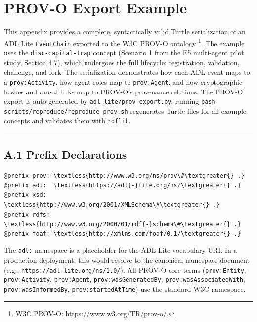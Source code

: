 \section{PROV-O Export Example}\label{a.-prov-o-export-example}

This appendix provides a complete, syntactically valid Turtle serialization of an ADL Lite \texttt{EventChain} exported to the W3C PROV-O ontology \footnote{W3C PROV-O: \url{https://www.w3.org/TR/prov-o/}.}. The example uses the \texttt{disc-capital-trap} concept (Scenario 1 from the E5 multi-agent pilot study, Section 4.7), which undergoes the full lifecycle: registration, validation, challenge, and fork. The serialization demonstrates how each ADL event maps to a \texttt{prov:Activity}, how agent roles map to \texttt{prov:Agent}, and how cryptographic hashes and causal links map to PROV-O's provenance relations. The PROV-O export is auto-generated by \texttt{adl\_lite/prov\_export.py}; running \texttt{bash scripts/reproduce/reproduce\_prov.sh} regenerates Turtle files for all example concepts and validates them with \texttt{rdflib}.

\begin{center}\rule{0.5\linewidth}{0.5pt}\end{center}


\subsection{A.1 Prefix Declarations}\label{a.1-prefix-declarations}

\begin{lstlisting}
@prefix prov: \textless{http://www.w3.org/ns/prov\#\textgreater{} .}
@prefix adl:  \textless{https://adl{-}lite.org/ns/\textgreater{} .}
@prefix xsd:  \textless{http://www.w3.org/2001/XMLSchema\#\textgreater{} .}
@prefix rdfs: \textless{http://www.w3.org/2000/01/rdf{-}schema\#\textgreater{} .}
@prefix foaf: \textless{http://xmlns.com/foaf/0.1/\textgreater{} .}
\end{lstlisting}

The \texttt{adl:} namespace is a placeholder for the ADL Lite vocabulary URI. In a production deployment, this would resolve to the canonical namespace document (e.g., \texttt{https://adl-lite.org/ns/1.0/}). All PROV-O core terms (\texttt{prov:Entity}, \texttt{prov:Activity}, \texttt{prov:Agent}, \texttt{prov:wasGeneratedBy}, \texttt{prov:wasAssociatedWith}, \texttt{prov:wasInformedBy}, \texttt{prov:startedAtTime}) use the standard W3C namespace.

